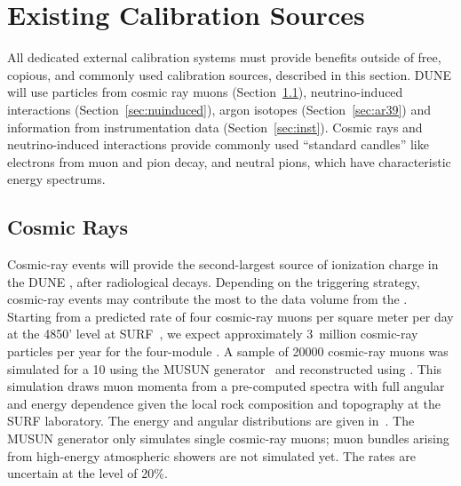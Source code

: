 \section{Existing Calibration Sources} \label{sec:existsource}

All dedicated external calibration systems must provide benefits outside of free, copious, and commonly used calibration sources, described in this section. DUNE will use particles from cosmic ray muons (Section~\ref{sec:cr}), neutrino-induced interactions (Section~\ref{sec:nuinduced}),  argon isotopes (Section~\ref{sec:ar39}) and information from instrumentation data  (Section~\ref{sec:inst}). Cosmic rays and neutrino-induced interactions provide commonly used ``standard candles'' like electrons from muon and pion decay, and neutral pions, which have characteristic energy spectrums. 

\subsection{Cosmic Rays }\label{sec:cr}

Cosmic-ray events will provide the second-largest source of ionization charge in the DUNE ,
after radiological decays.  Depending on the triggering strategy, cosmic-ray events may contribute the
most to the data volume from the \fardet.  Starting from a predicted rate of four cosmic-ray muons
per square meter per day at the 4850' level at SURF~\cite{LBNEDOCDB9673}, we expect 
approximately \num{3}~million cosmic-ray particles per year for the four-module .
A sample of \num{20000} cosmic-ray muons was simulated for a %
\SI{10}{\kt}  using the MUSUN
generator~\cite{Kudryavtsev:2008qh} and reconstructed using .  This simulation draws muon
momenta from a pre-computed spectra with full angular and energy dependence given the local rock
composition and topography at the SURF laboratory.  The energy and angular distributions are given
in~\cite{LBNEDOCDB9673}.  The MUSUN generator only simulates single cosmic-ray muons;
muon bundles arising from high-energy atmospheric showers are not simulated yet.
The rates are uncertain at the level of 20\%.

